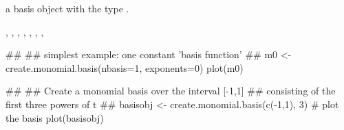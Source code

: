 \documentclass{article}
\begin{document}
\begin{Value}
a basis object with the type .
\end{Value}
\begin{SeeAlso}\relax
{}, 
, 
, 
, 
, 
, 
, 
\end{SeeAlso}
\begin{Examples}
\begin{ExampleCode}
##
## simplest example: one constant 'basis function' 
##
m0 <- create.monomial.basis(nbasis=1, exponents=0)
plot(m0)

##
## Create a monomial basis over the interval [-1,1]
##  consisting of the first three powers of t
##
basisobj <- create.monomial.basis(c(-1,1), 3)
#  plot the basis
plot(basisobj)
\end{ExampleCode}
\end{Examples}
\end{document}
